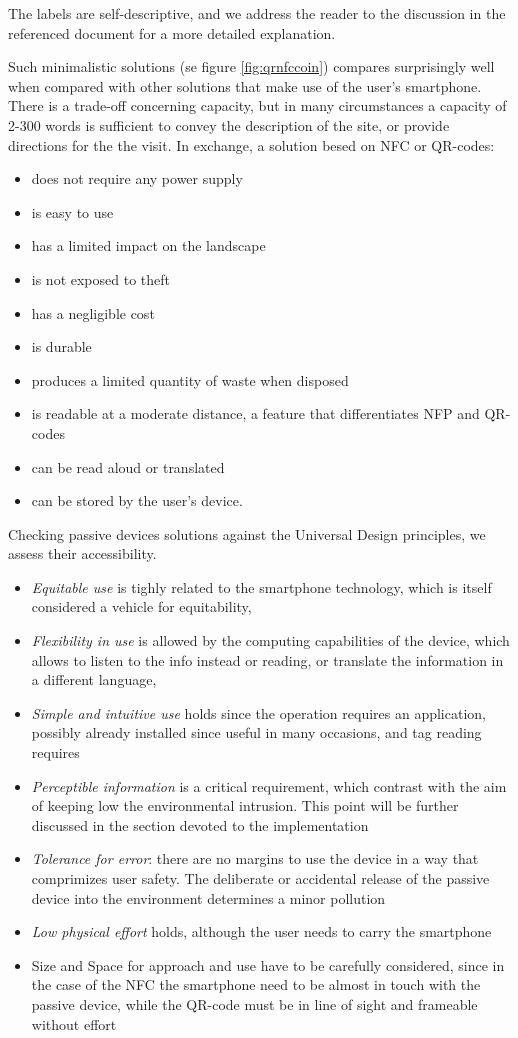 \documentclass[sustainability,article,submit,pdftex,moreauthors]{Definitions/mdpi}
\begin{document}
The labels are self-descriptive, and we address the reader to the discussion in the referenced document for a more detailed explanation.

Such minimalistic solutions (se figure \ref{fig:qrnfccoin}) compares surprisingly well when compared with other solutions that make use of the user's smartphone. There is a trade-off concerning capacity, but in many circumstances a capacity of 2-300 words is sufficient to convey the description of the site, or provide directions for the the visit. In exchange, a solution besed on NFC or QR-codes:
\begin{itemize} 
\item does not require any power supply
\item is easy to use
\item has a limited impact on the landscape
\item is not exposed to theft
\item has a negligible cost
\item is durable
\item produces a limited quantity of waste when disposed
\item is readable at a moderate distance, a feature that differentiates NFP and QR-codes
\item can be read aloud or translated
\item can be stored by the user's device.
\end{itemize}

Checking passive devices solutions against the Universal Design principles, we assess their accessibility.

\begin{itemize}
	\item {\em Equitable use} is tighly related to the smartphone technology, which is itself considered a vehicle for equitability,
	\item {\em Flexibility in use} is allowed by the computing capabilities of the device, which allows to listen to the info instead or reading, or translate the information in a different language,
	\item {\em Simple and intuitive use} holds since the operation requires an application, possibly already installed since useful in many occasions, and tag reading requires
	\item{\em Perceptible information} is a critical requirement, which contrast with the aim of keeping low the environmental intrusion. This point will be further discussed in the section devoted to the implementation
	\item{\em Tolerance for error}: there are no margins to use the device in a way that comprimizes user safety. The deliberate or accidental release of the passive device into the environment determines a minor pollution
	\item{\em Low physical effort} holds, although the user needs to carry the smartphone
	\item{Size and Space for approach and use} have to be carefully considered, since in the case of the NFC the smartphone need to be almost in touch with the passive device, while the QR-code must be in line of sight and frameable without effort
\end{itemize}
\end{document}
